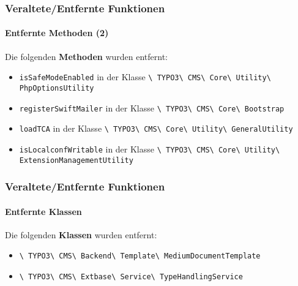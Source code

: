 \begin{frame}[fragile]
	\frametitle{Veraltete/Entfernte Funktionen}
	\framesubtitle{Entfernte Methoden (2)}

	Die folgenden \textbf{Methoden} wurden entfernt:

	\begin{itemize}

		\item
			\small
				\texttt{isSafeModeEnabled}\newline
				in der Klasse
				\texttt{\textbackslash
					TYPO3\textbackslash
					CMS\textbackslash
					Core\textbackslash
					Utility\textbackslash
					PhpOptionsUtility}
			\normalsize
		\item
			\small
				\texttt{registerSwiftMailer}\newline
				in der Klasse
				\texttt{\textbackslash
					TYPO3\textbackslash
					CMS\textbackslash
					Core\textbackslash
					Bootstrap}
			\normalsize
		\item
			\small
				\texttt{loadTCA}\newline
				in der Klasse
				\texttt{\textbackslash
					TYPO3\textbackslash
					CMS\textbackslash
					Core\textbackslash
					Utility\textbackslash
					GeneralUtility}
			\normalsize
		\item
			\small
				\texttt{isLocalconfWritable}\newline
				in der Klasse
				\texttt{\textbackslash
					TYPO3\textbackslash
					CMS\textbackslash
					Core\textbackslash
					Utility\textbackslash
					ExtensionManagementUtility}
			\normalsize

	\end{itemize}

\end{frame}


\begin{frame}[fragile]
	\frametitle{Veraltete/Entfernte Funktionen}
	\framesubtitle{Entfernte Klassen}

	Die folgenden \textbf{Klassen} wurden entfernt:

	\begin{itemize}

		\item
			\smaller
				\texttt{\textbackslash
					TYPO3\textbackslash
					CMS\textbackslash
					Backend\textbackslash
					Template\textbackslash
					MediumDocumentTemplate}
			\normalsize
		\item
			\smaller
				\texttt{\textbackslash
					TYPO3\textbackslash
					CMS\textbackslash
					Extbase\textbackslash
					Service\textbackslash
					TypeHandlingService}
			\normalsize

	\end{itemize}

\end{frame}

